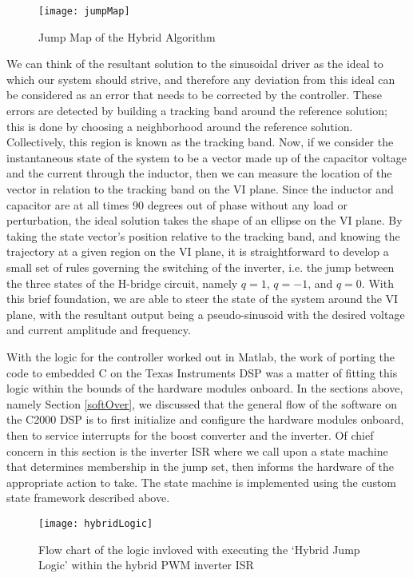 \begin{figure}[htbp]
\begin{center}
\texttt{[image: jumpMap]}
\caption{Jump Map of the Hybrid Algorithm \cite{ricardo}}
\label{jump}
\end{center}
\end{figure}


We can think of the resultant solution to the sinusoidal driver as the ideal to which our system should strive, and therefore any deviation from this ideal can be considered as an error that needs to be corrected by the controller. These errors are detected by building a tracking band around the reference solution; this is done by choosing a neighborhood around the reference solution. Collectively, this region is known as the tracking band. Now, if we consider the instantaneous state of the system to be a vector made up of the capacitor voltage and the current through the inductor, then we can measure the location of the vector in relation to the tracking band on the VI plane. Since the inductor and capacitor are at all times 90 degrees out of phase without any load or perturbation, the ideal solution takes the shape of an ellipse on the VI plane. By taking the state vector's position relative to the tracking band, and knowing the trajectory at a given region on the VI plane, it is straightforward to develop a small set of rules governing the switching of the inverter, i.e. the jump between the three states of the H-bridge circuit, namely $q=1$, $q=-1$, and $q=0$. With this brief foundation, we are able to steer the state of the system around the VI plane, with the resultant output being a pseudo-sinusoid with the desired voltage and current amplitude and frequency. 

With the logic for the controller worked out in Matlab, the work of porting the code to embedded C on the Texas Instruments DSP was a matter of fitting this logic within the bounds of the hardware modules onboard.
In the sections above, namely Section \ref{softOver}, we discussed that the general flow of the software on the C2000 DSP is to first initialize and configure the hardware modules onboard, then to service interrupts for the boost converter and the inverter. Of chief concern in this section is the inverter ISR where we call upon a state machine that determines membership in the jump set, then informs the hardware of the appropriate action to take. The state machine is implemented using the custom state framework described above.

\begin{figure}[h]
\begin{center}
\texttt{[image: hybridLogic]}
\caption{Flow chart of the logic invloved with executing the `Hybrid Jump Logic' within the hybrid PWM inverter ISR}
\label{fast}
\end{center}
\end{figure}

